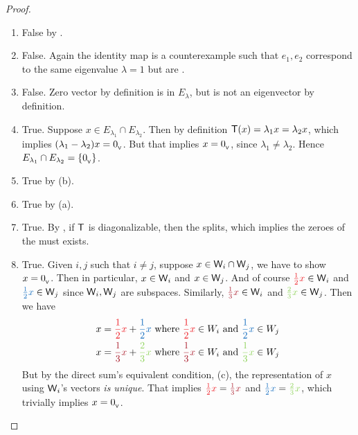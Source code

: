 \begin{proof} \ 

\begin{enumerate}
\item False by .
\item False. Again the identity map is a counterexample such that \(e_1, e_2\) correspond to the same eigenvalue \(\lambda = 1\) but are \LID{}.
\item False. Zero vector by definition is in \(E_{\lambda}\), but is not an eigenvector by definition.

\item True.
Suppose \(x \in E_{\lambda_1} \cap E_{\lambda_2}\).
Then by definition \(\textsf{T}(x) = \lambda_1 x = \lambda_2 x\), which implies \((\lambda_1 - \lambda_2) x = 0_{_{\textsf{V}}}\).
But that implies \(x = 0_{_{\textsf{V}}}\), since \(\lambda_1 \ne \lambda_2\).
Hence \(E_{\lambda_1} \cap E_{\lambda_2} = \{ 0_{_{\textsf{V}}} \}\).

\item True by (b).
\item True by (a).
\item True.
By , if \(\textsf{T}\) is diagonalizable, then the \CPOLY{} splits, which implies the zeroes of the \CPOLY{} must exists.

\item True.
Given \(i, j\) such that \(i \ne j\), suppose \(x \in \textsf{W}_i \cap \textsf{W}_j\), we have to show \(x = 0_{_{\textsf{V}}}\).
Then in particular, \(x \in \textsf{W}_i\) and \(x \in \textsf{W}_j\).
And of course \(\RED{\frac{1}{2}x} \in \W_i\) and \(\BLUE{\frac{1}{2}x} \in \W_j\) since \(\textsf{W}_i, \textsf{W}_j\) are subspaces.
Similarly, \(\MAROON{\frac{1}{3}x} \in \W_i\) and \(\GREEN{\frac{2}{3}x} \in \W_j\).
Then we have
\begin{align*}
    x & = \RED{\frac{1}{2}x} + \BLUE{\frac{1}{2}x} \text{ where } \RED{\frac{1}{2}x} \in W_i \text{ and } \BLUE{\frac{1}{2}x} \in W_j \\
    x & = \MAROON{\frac{1}{3}x} + \GREEN{\frac{2}{3}x} \text{ where } \MAROON{\frac{1}{3}x} \in W_i \text{ and } \GREEN{\frac{1}{3}x} \in W_j
\end{align*}
But by the direct sum's equivalent condition, (c), the representation of \(x\) using \(\textsf{W}_i\)'s vectors \emph{is unique}.
That implies \(\RED{\frac{1}{2}x} = \MAROON{\frac{1}{3}x}\) and \(\BLUE{\frac{1}{2}x} = \GREEN{\frac{2}{3}x}\), which trivially implies \(x = 0_{_{\textsf{V}}}\).


\end{enumerate}
\end{proof}
